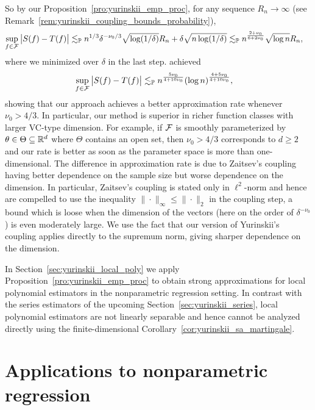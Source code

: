 So by our Proposition~\ref{pro:yurinskii_emp_proc},
for any sequence $R_n \to \infty$
(see Remark~\ref{rem:yurinskii_coupling_bounds_probability}),
%
\begin{align*}
  \sup_{f \in \mathcal{F}}
  \big| S(f) - T(f) \big|
  &\lesssim_{\mathbb{P}}
  n^{1/3} \delta^{-\nu_0/3}
  \sqrt{\log(1/\delta)} R_n
  + \delta \sqrt{n\log(1/\delta)}
  \lesssim_{\mathbb{P}}
  n^{\frac{2+\nu_0}{6+2\nu_0}}
  \sqrt{\log n} R_n,
\end{align*}
%
where we minimized over $\delta$ in the last step.
\citet[Proposition~1]{berthet2006revisiting} achieved
%
\begin{align*}
  \sup_{f \in \mathcal{F}}
  \big| S(f) - T(f) \big|
  &\lesssim_{\mathbb{P}}
  n^{\frac{5\nu_0}{4+10\nu_0}}
  (\log n)^{\frac{4+5\nu_0}{4+10\nu_0}},
\end{align*}
%
showing that our approach achieves a better approximation rate whenever
$\nu_0 > 4/3$. In particular, our method is superior in richer function classes
with larger VC-type dimension. For example, if $\mathcal{F}$ is smoothly parameterized
by $\theta \in \Theta \subseteq \mathbb{R}^d$ where $\Theta$ contains an open set, then
$\nu_0 > 4/3$ corresponds to $d \geq 2$ and our rate is better as soon as the
parameter space is more than one-dimensional. The difference in approximation
rate is due to Zaitsev's coupling having better dependence on the sample size
but worse dependence on the dimension. In particular, Zaitsev's coupling is
stated only in $\ell^2$-norm and hence
\citet[Equation~5.3]{berthet2006revisiting} are compelled to use the inequality
$\|\cdot\|_\infty \leq \|\cdot\|_2$ in the coupling step, a bound which is
loose when the dimension of the vectors (here on the order of
$\delta^{-\nu_0}$) is even moderately large. We use the fact that our version
of Yurinskii's coupling applies directly to the supremum norm, giving sharper
dependence on the dimension.

In Section~\ref{sec:yurinskii_local_poly} we apply
Proposition~\ref{pro:yurinskii_emp_proc} to
obtain strong approximations for local polynomial estimators in the
nonparametric regression setting. In contrast with the series estimators of the
upcoming Section~\ref{sec:yurinskii_series}, local polynomial estimators are
not linearly
separable and hence cannot be analyzed directly using the finite-dimensional
Corollary~\ref{cor:yurinskii_sa_martingale}.

\section{Applications to nonparametric regression}
\label{sec:yurinskii_nonparametric}

